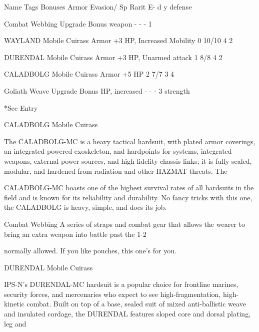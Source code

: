  Name                                  Tags          Bonuses                        Armor     Evasion/      Sp     Rarit 
                                                                                              E-            d      y 
                                                                                              defense 

 Combat Webbing                        Upgrade       Bonus weapon                    -        -             -      1 

  WAYLAND Mobile Cuirass               Armor         +3 HP, Increased Mobility      0         10/10         4      2 

 DURENDAL Mobile Cuirass               Armor         +3 HP, Unarmed attack          1         8/8           4      2 

 CALADBOLG Mobile Cuirass              Armor         +5 HP                          2         7/7           3      4 

 Goliath Weave                         Upgrade       Bonus HP, increased            -         -             -      3 
                                                    strength 

*See Entry
 

CALADBOLG Mobile Cuirass  

The CALADBOLG-MC is a heavy tactical hardsuit, with plated armor coverings, an integrated powered  
exoskeleton, and hardpoints for systems, integrated weapons, external power sources, and high-fidelity  
chassis links; it is fully sealed, modular, and hardened from radiation and other HAZMAT threats. The  

CALADBOLG-MC boasts one of the highest survival rates of all hardsuits in the field and is known for its  
reliability and durability. No fancy tricks with this one, the CALADBOLG is heavy, simple, and does its job.     

Combat Webbing  
A series of straps and combat gear that allows the wearer to bring an extra weapon into battle past the 1-2  

normally allowed. If you like pouches, this one’s for you. 
 

DURENDAL Mobile Cuirass  

IPS-N’s DURENDAL-MC hardsuit is a popular choice for frontline marines, security forces, and mercenaries  
who expect to see high-fragmentation, high-kinetic combat. Built on top of a base, sealed suit of mixed  
anti-ballistic weave and insulated cordage, the DURENDAL features sloped core and dorsal plating, leg and  

